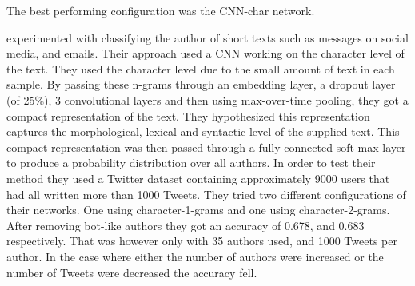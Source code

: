 The best performing configuration was the CNN-char network.

\citet{shrestha2017} experimented with classifying the author of short texts
such as messages on social media, and emails. Their approach used a \gls{CNN}
working on the character level of the text. They used the character level due
to the small amount of text in each sample. By passing these n-grams through
an embedding layer, a dropout layer (of 25\%), 3 convolutional layers and then
using max-over-time pooling, they got a compact representation of the text.
They hypothesized this representation captures the morphological, lexical
and syntactic level of the supplied text. This compact representation was
then passed through a fully connected soft-max layer to produce a probability
distribution over all authors. In order to test their method they used a Twitter
dataset containing approximately 9000 users that had all written more than 1000
Tweets. They tried two different configurations of their networks. One using
character-1-grams and one using character-2-grams. After removing bot-like
authors they got an accuracy of 0.678, and 0.683 respectively. That was however
only with 35 authors used, and 1000 Tweets per author. In the case where either
the number of authors were increased or the number of Tweets were decreased the
accuracy fell.


